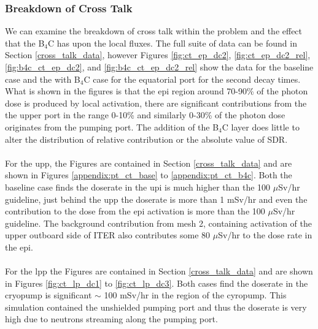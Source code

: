 \documentclass[12pt]{article}
\begin{document}
\subsubsection{Breakdown of Cross Talk}
We can examine the breakdown of cross talk within the problem and the effect 
that the B$_4$C has upon the local fluxes. The full suite of data can be found
in Section \ref{cross_talk_data}, however Figures \ref{fig:ct_ep_dc2},
\ref{fig:ct_ep_dc2_rel}, \ref{fig:b4c_ct_ep_dc2}, and \ref{fig:b4c_ct_ep_dc2_rel} 
show the data for the baseline case and the with B$_4$C case for the equatorial 
port for the second decay times. What is shown in the figures is that the \gls{epi}
region around 70-90\% of the photon dose is produced by local activation, there are
significant contributions from the the upper port in the range 0-10\% and 
similarly 0-30\% of the photon dose originates from the pumping port. The 
addition of the B$_4$C layer does little to alter the distribution of 
relative contribution or the absolute value of SDR.
\\
\\
For the \gls{upp}, the Figures are contained in Section \ref{cross_talk_data} and are 
shown in Figures \ref{appendix:pt_ct_base} to \ref{appendix:pt_ct_b4c}. 
Both the baseline case finds the doserate in 
the \gls{upi} is much higher than the 100 $\mu$Sv/hr guideline, just behind the 
\gls{upp} the doserate is more than 1 mSv/hr and even the contribution to the 
dose from the \gls{epi} activation is more than the 100 $\mu$Sv/hr guideline. 
The background contribution from mesh 2, containing activation of the upper
outboard side of ITER also contributes some 80 $\mu$Sv/hr to the dose rate in 
the \gls{epi}.
\\
\\
For the \gls{lpp} the Figures are contained in Section \ref{cross_talk_data} and are 
shown in Figures \ref{fig:ct_lp_dc1} to \ref{fig:ct_lp_dc3}. Both cases find the doserate in 
the cryopump is significant $\sim$ 100 mSv/hr in the region of the cyropump. 
This simulation contained the unshielded pumping port and thus the doserate is 
very high due to neutrons streaming along the pumping port. 
\end{document}
